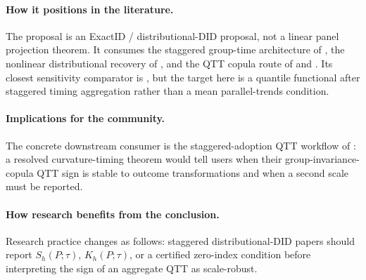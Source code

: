 \documentclass[11pt]{article}
\theoremstyle{definition}
\theoremstyle{plain}
\theoremstyle{remark}
\begin{document}
\paragraph{How it positions in the literature.}
The proposal is an ExactID / distributional-DID proposal, not a linear panel
projection theorem.  It consumes the staggered group-time architecture of
\citet{CallawaySantAnna2021}, the nonlinear distributional recovery of
\citet{AtheyImbens2006}, and the QTT copula route of \citet{CallawayLi2019} and
\citet[Section~2]{LiLin2024}.  Its closest sensitivity comparator is
\citet[Proposition~1]{RothSantAnna2023}, but the target here is a quantile functional after
staggered timing aggregation rather than a mean parallel-trends condition.

\paragraph{Implications for the community.}
The concrete downstream consumer is the staggered-adoption QTT workflow of
\citet{LiLin2024}: a resolved curvature-timing theorem would tell users when their
group-invariance-copula QTT sign is stable to outcome transformations and when a
second scale must be reported.

\paragraph{How research benefits from the conclusion.}
Research practice changes as follows: staggered distributional-DID papers should
report \(S_h(P;\tau)\), \(K_h(P;\tau)\), or a certified zero-index condition
before interpreting the sign of an aggregate QTT as scale-robust.
\end{document}
